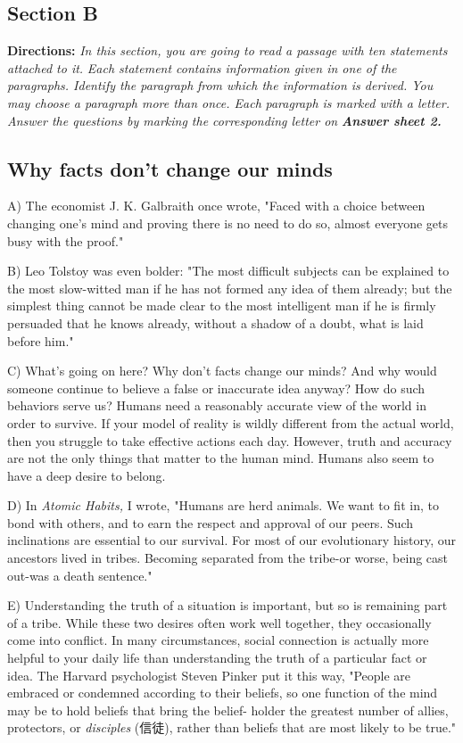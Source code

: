\documentclass[UTF8,11pt]{ctexart}
\begin{document}
\subsection*{\textbf{Section B}}


\textbf{Directions: }\textit{In this section, you are going to read a passage with ten statements attached to it.} \textit{Each statement contains information given in one of the paragraphs. Identify the paragraph} \textit{from which the information is derived. You may choose a paragraph more than once. Each} \textit{paragraph is marked with a letter. Answer the questions by marking the corresponding letter on} \textbf{\textit{Answer sheet 2.}}


\subsection*{\textbf{Why facts don't change our minds}}


A) The economist J. K. Galbraith once wrote, "Faced with a choice between changing one's mind and proving there is no need to do so, almost everyone gets busy with the proof."


B) Leo Tolstoy was even bolder: "The most difficult subjects can be explained to the most slow-witted man if he has not formed any idea of them already; but the simplest thing cannot be made clear to the most intelligent man if he is firmly persuaded that he knows already, without a shadow of a doubt, what is laid before him."


C) What's going on here? Why don't facts change our minds? And why would someone continue to believe a false or inaccurate idea anyway? How do such behaviors serve us? Humans need a reasonably accurate view of the world in order to survive. If your model of reality is wildly different from the actual world, then you struggle to take effective actions each day. However, truth and accuracy are not the only things that matter to the human mind. Humans also seem to have a deep desire to belong.


D) In \textit{Atomic Habits, }I wrote, "Humans are herd animals. We want to fit in, to bond with others, and to earn the respect and approval of our peers. Such inclinations are essential to our survival. For most of our evolutionary history, our ancestors lived in tribes. Becoming separated from the tribe-or worse, being cast out-was a death sentence."


E) Understanding the truth of a situation is important, but so is remaining part of a tribe. While these two desires often work well together, they occasionally come into conflict. In many circumstances, social connection is actually more helpful to your daily life than understanding the truth of a particular fact or idea. The Harvard psychologist Steven Pinker put it this way, "People are embraced or condemned according to their beliefs, so one function of the mind may be to hold beliefs that bring the belief- holder the greatest number of allies, protectors, or \textit{disciples }(信徒), rather than beliefs that are most likely to be true."
\end{document}
